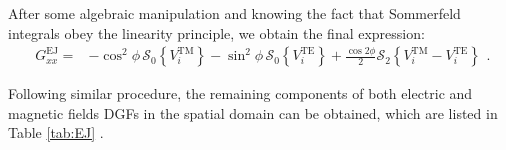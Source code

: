 \documentclass[12pt]{article}
\begin{document}
%
After some algebraic manipulation and knowing the fact that Sommerfeld integrals obey the linearity principle, we obtain the final expression:
%
\begin{equation}
  \begin{split}
    G_{xx}^\mathrm{EJ} ={}& - \cos^2 \phi \, \mathcal{S}_0 \left \{ V_i^\mathrm{TM} \right \}  - \sin^2 \phi \, \mathcal{S}_0 \left \{ V_i^\mathrm{TE} \right \} + \frac{\cos 2 \phi}{2} \mathcal{S}_2 \left \{  V_i^\mathrm{TM} -  V_i^\mathrm{TE} \right \}
  \end{split}.
  \label{eq:Gxx_final_equation}
\end{equation}
%

Following similar procedure, the remaining components of both electric and magnetic fields DGFs in the spatial domain can be obtained, which are listed in Table \ref{tab:EJ} \cite{Michalski2005}.
%
\end{document}
